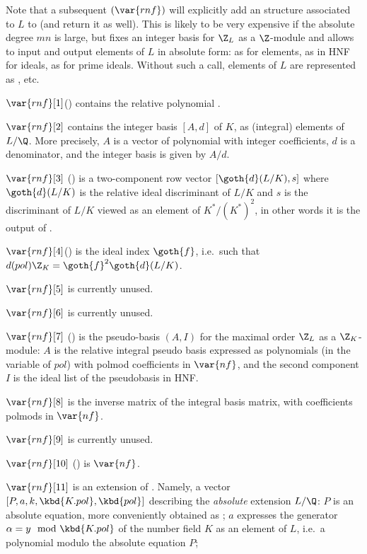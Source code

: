 Note that a subsequent $(\var{rnf})$ will explicitly add an
 structure associated to $L$ to  (and return it as well).
This is likely to be very expensive if the absolute degree $mn$ is large,
but fixes an integer basis for $\Z_L$ as a $\Z$-module and allows to input
and output elements of $L$ in absolute form: as  for elements,
as  in HNF for ideals, as  for prime ideals. Without such
a call, elements of $L$ are represented as , etc.

$\var{rnf}[1]$() contains the relative polynomial .

$\var{rnf}[2]$ contains the integer basis $[A,d]$ of $K$, as
(integral) elements of $L/\Q$. More precisely, $A$ is a vector of
polynomial with integer coefficients, $d$ is a denominator, and the integer
basis is given by $A/d$.

$\var{rnf}[3]$ () is a two-component row vector
$[\goth{d}(L/K),s]$ where $\goth{d}(L/K)$ is the relative ideal discriminant
of $L/K$ and $s$ is the discriminant of $L/K$ viewed as an element of
$K^*/(K^*)^2$, in other words it is the output of .

$\var{rnf}[4]$() is the ideal index $\goth{f}$, i.e.~such
that $d(pol)\Z_K=\goth{f}^2\goth{d}(L/K)$.

$\var{rnf}[5]$ is currently unused.

$\var{rnf}[6]$ is currently unused.

$\var{rnf}[7]$ () is the pseudo-basis $(A,I)$ for the maximal
order $\Z_L$ as a $\Z_K$-module: $A$ is the relative integral pseudo basis
expressed as polynomials (in the variable of $pol$) with polmod coefficients
in $\var{nf}$, and the second component $I$ is the ideal list of the
pseudobasis in HNF.

$\var{rnf}[8]$ is the inverse matrix of the integral basis matrix, with
coefficients polmods in $\var{nf}$.

$\var{rnf}[9]$ is currently unused.

$\var{rnf}[10]$ () is $\var{nf}$.

$\var{rnf}[11]$ is an extension of . Namely, a
vector $[P, a, k, \kbd{K.pol}, \kbd{pol}]$ describing the \emph{absolute}
extension
$L/\Q$: $P$ is an absolute equation, more conveniently obtained
as ; $a$ expresses the generator $\alpha = y \mod \kbd{K.pol}$
of the number field $K$ as an element of $L$, i.e.~a polynomial modulo the
absolute equation $P$;

